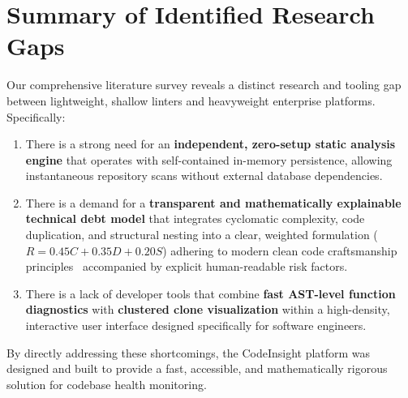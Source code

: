 \section{Summary of Identified Research Gaps}
Our comprehensive literature survey reveals a distinct research and tooling gap between lightweight, shallow linters and heavyweight enterprise platforms. Specifically:
\begin{enumerate}
    \item There is a strong need for an \textbf{independent, zero-setup static analysis engine} that operates with self-contained in-memory persistence, allowing instantaneous repository scans without external database dependencies.
    \item There is a demand for a \textbf{transparent and mathematically explainable technical debt model} that integrates cyclomatic complexity, code duplication, and structural nesting into a clear, weighted formulation ($R = 0.45C + 0.35D + 0.20S$) adhering to modern clean code craftsmanship principles~\cite{martin2008} accompanied by explicit human-readable risk factors.
    \item There is a lack of developer tools that combine \textbf{fast AST-level function diagnostics} with \textbf{clustered clone visualization} within a high-density, interactive user interface designed specifically for software engineers.
\end{enumerate}
By directly addressing these shortcomings, the CodeInsight platform was designed and built to provide a fast, accessible, and mathematically rigorous solution for codebase health monitoring.

